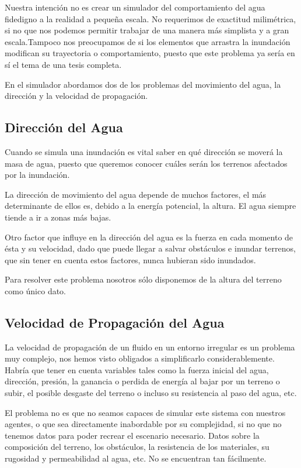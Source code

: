 Nuestra intención no es crear un simulador del comportamiento del agua
fidedigno a la realidad a pequeña escala. No requerimos de exactitud
milimétrica, si no que nos podemos permitir trabajar de una manera más
simplista y a gran escala.Tampoco nos preocupamos de si los elementos que
arrastra la inundación modifican su trayectoria o comportamiento, puesto que
este problema ya sería en sí el tema de una tesis completa.

En el simulador abordamos dos de los problemas del movimiento del agua, la
dirección y la velocidad de propagación.

\subsection*{Dirección del Agua}

Cuando se simula una inundación es vital saber en qué dirección se moverá la
masa de agua, puesto que queremos conocer cuáles serán los terrenos afectados
por la inundación.

La dirección de movimiento del agua depende de muchos factores, el más
determinante de ellos es, debido a la energía potencial, la altura. El agua
siempre tiende a ir a zonas más bajas.

Otro factor que influye en la dirección del agua es la fuerza en cada momento
de ésta y su velocidad, dado que puede llegar a salvar obstáculos e inundar
terrenos, que sin tener en cuenta estos factores, nunca hubieran sido inundados.

Para resolver este problema nosotros sólo disponemos de la altura del terreno
como único dato.

\subsection*{Velocidad de Propagación del Agua}

La velocidad de propagación de un fluido en un entorno irregular es un problema
muy complejo, nos hemos visto obligados a simplificarlo considerablemente.
Habría que tener en cuenta variables tales como la fuerza inicial del agua,
dirección, presión, la ganancia o perdida de energía al bajar por un terreno o
subir, el posible desgaste del terreno o incluso su resistencia al paso del
agua, etc.

El problema no es que no seamos capaces de simular este sistema con nuestros
agentes, o que sea directamente inabordable por su complejidad, si no que no
tenemos datos para poder recrear el escenario necesario. Datos sobre la
composición del terreno, los obstáculos, la resistencia de los materiales,
su rugosidad y permeabilidad al agua, etc. No se encuentran tan fácilmente.

